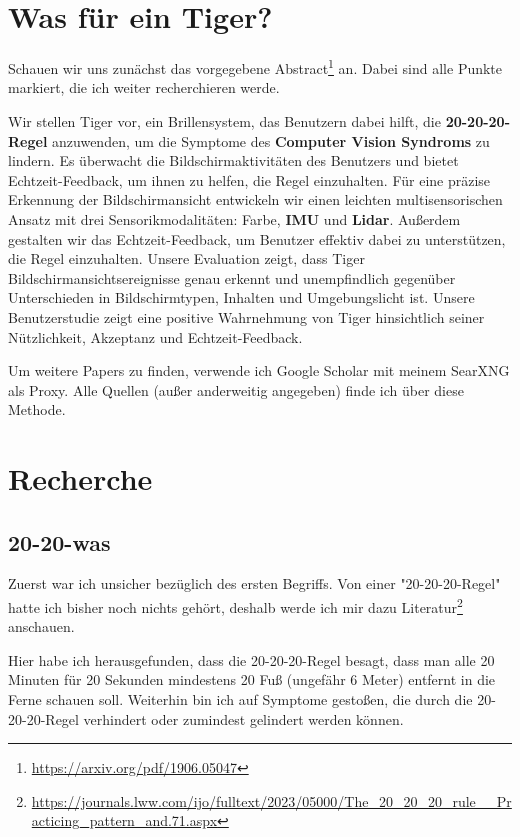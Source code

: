 \section{Was für ein Tiger?}

Schauen wir uns zunächst das vorgegebene Abstract\footnote{\url{https://arxiv.org/pdf/1906.05047}} an. Dabei sind alle Punkte markiert, die ich weiter recherchieren werde.

Wir stellen Tiger vor, ein Brillensystem, das Benutzern dabei hilft, die \textbf{20-20-20-Regel} anzuwenden, um die Symptome des \textbf{Computer Vision Syndroms} zu lindern. Es überwacht die Bildschirmaktivitäten des Benutzers und bietet Echtzeit-Feedback, um ihnen zu helfen, die Regel einzuhalten. Für eine präzise Erkennung der Bildschirmansicht entwickeln wir einen leichten multisensorischen Ansatz mit drei Sensorikmodalitäten: Farbe, \textbf{IMU} und \textbf{Lidar}. Außerdem gestalten wir das Echtzeit-Feedback, um Benutzer effektiv dabei zu unterstützen, die Regel einzuhalten. Unsere Evaluation zeigt, dass Tiger Bildschirmansichtsereignisse genau erkennt und unempfindlich gegenüber Unterschieden in Bildschirmtypen, Inhalten und Umgebungslicht ist. Unsere Benutzerstudie zeigt eine positive Wahrnehmung von Tiger hinsichtlich seiner Nützlichkeit, Akzeptanz und Echtzeit-Feedback.

Um weitere Papers zu finden, verwende ich Google Scholar mit meinem SearXNG als Proxy. Alle Quellen (außer anderweitig angegeben) finde ich über diese Methode.

\section{Recherche}

\subsection{20-20-was}

Zuerst war ich unsicher bezüglich des ersten Begriffs. Von einer "20-20-20-Regel" hatte ich bisher noch nichts gehört, deshalb werde ich mir dazu Literatur\footnote{\url{https://journals.lww.com/ijo/fulltext/2023/05000/The_20_20_20_rule__Practicing_pattern_and.71.aspx}} anschauen.

Hier habe ich herausgefunden, dass die 20-20-20-Regel besagt, dass man alle 20 Minuten für 20 Sekunden mindestens 20 Fuß (ungefähr 6 Meter) entfernt in die Ferne schauen soll. Weiterhin bin ich auf Symptome gestoßen, die durch die 20-20-20-Regel verhindert oder zumindest gelindert werden können.

